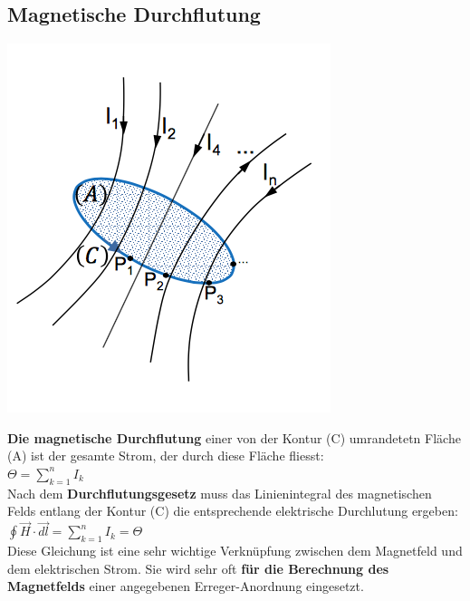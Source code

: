 \subsection{Magnetische Durchflutung}
\begin{minipage}{0.2 \linewidth}
    \includegraphics[width =\linewidth]{./Pics/VL2/magDurchflutung}
\end{minipage}
\begin{minipage}{0.8 \linewidth}
\textbf{Die magnetische Durchflutung} einer von der Kontur (C) umrandetetn Fläche (A) ist der gesamte Strom, der durch diese Fläche fliesst: \\

$\Theta = \sum_{k = 1}^{n} I_k$\\

Nach dem \textbf{Durchflutungsgesetz} muss das Linienintegral des magnetischen Felds entlang der Kontur (C) die entsprechende elektrische Durchlutung ergeben: \\

$\oint \vec{H} \cdot \vec{dl} = \sum_{k=1}^{n} I_k = \Theta$\\

Diese Gleichung ist eine sehr wichtige Verknüpfung zwischen dem Magnetfeld und dem elektrischen Strom. Sie wird sehr oft \textbf{für die Berechnung des Magnetfelds} einer angegebenen Erreger-Anordnung eingesetzt. 
\end{minipage}

